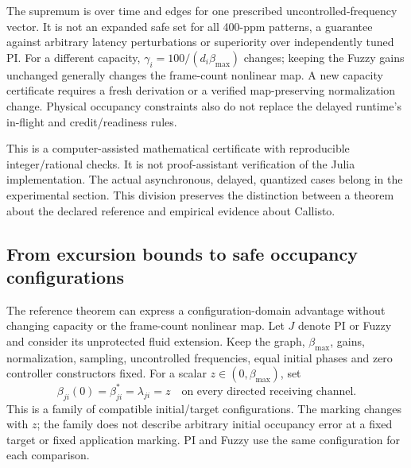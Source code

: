 The supremum is over time and edges for one prescribed uncontrolled-frequency
vector. It is not an expanded safe set for all 400-ppm patterns, a guarantee
against arbitrary latency perturbations or superiority over independently
tuned PI. For a different capacity, $\gamma_i=100/(d_i\beta_{\max})$ changes; keeping
the Fuzzy gains unchanged generally changes the frame-count nonlinear
map. A new capacity certificate requires a fresh derivation or a verified
map-preserving normalization change. Physical occupancy constraints also
do not replace the delayed runtime's in-flight and credit/readiness rules.

This is a computer-assisted mathematical certificate with reproducible
integer/rational checks. It is not proof-assistant verification of the
Julia implementation. The actual asynchronous, delayed, quantized cases
belong in the experimental section. This division preserves the distinction
between a theorem about the declared reference and empirical evidence
about Callisto.


\subsection{From excursion bounds to safe occupancy configurations}
\label{detail:subsec:btd_occupancy_translation}
The reference theorem can express a configuration-domain advantage
without changing capacity or the frame-count nonlinear map.
Let $J$ denote PI or Fuzzy and consider its unprotected fluid
extension. Keep the graph, $\beta_{\max}$, gains, normalization, sampling,
uncontrolled frequencies, equal initial phases and zero controller
constructors fixed. For a scalar $z\in(0,\beta_{\max})$, set
\begin{equation}
 \beta_{ji}(0)=\beta_{ji}^*=\lambda_{ji}=z
 \quad\text{on every directed receiving channel}.
 \label{detail:eq:btd_translated_configuration}
\end{equation}
This is a family of compatible initial/target configurations.
The marking changes with $z$; the family does not describe arbitrary
initial occupancy error at a fixed target or fixed application marking.
PI and Fuzzy use the same configuration for each comparison.

